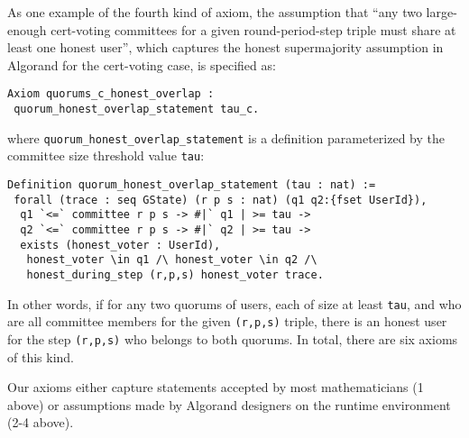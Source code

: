 As one example of the fourth kind of axiom, the assumption that ``any two large-enough cert-voting committees for a given round-period-step triple must share at least one honest user'', which captures the honest supermajority assumption in Algorand for the cert-voting case, is specified as:
\begin{lstlisting}[language=Coq]
Axiom quorums_c_honest_overlap :
 quorum_honest_overlap_statement tau_c.
\end{lstlisting}
where \lstinline{quorum_honest_overlap_statement} is a definition parameterized by the committee size threshold value \lstinline{tau}:
\begin{lstlisting}[language=Coq]
Definition quorum_honest_overlap_statement (tau : nat) :=
 forall (trace : seq GState) (r p s : nat) (q1 q2:{fset UserId}),
  q1 `<=` committee r p s -> #|` q1 | >= tau ->					
  q2 `<=` committee r p s -> #|` q2 | >= tau ->					
  exists (honest_voter : UserId),
   honest_voter \in q1 /\ honest_voter \in q2 /\
   honest_during_step (r,p,s) honest_voter trace.
\end{lstlisting}
In other words, if for any two quorums of users, each of size at least \lstinline{tau}, and who are all committee members for the given \lstinline{(r,p,s)} triple, there is an honest user for the step \lstinline{(r,p,s)} who belongs to both quorums. In total, there are six axioms of this kind.

Our axioms either capture statements accepted by most mathematicians (1 above) or assumptions made by Algorand designers on the runtime environment (2-4 above).

